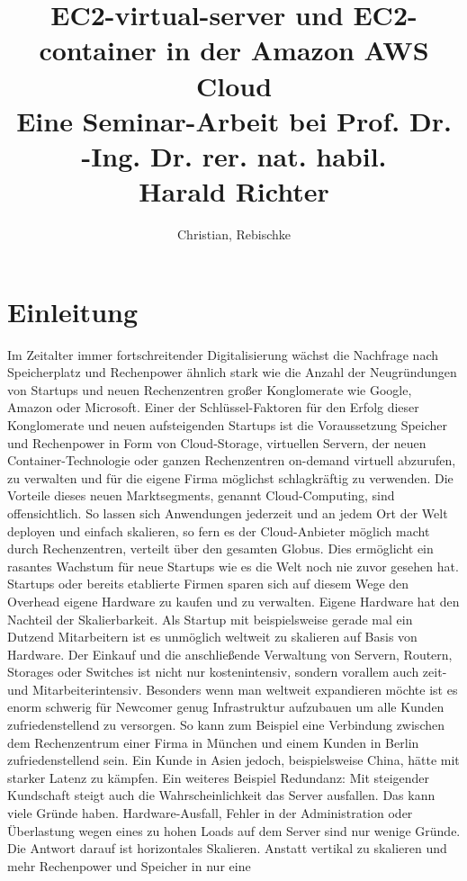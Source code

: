 \documentclass[titlepage]{report}
\title{EC2-virtual-server und EC2-container in der Amazon AWS Cloud \\
\large Eine Seminar-Arbeit bei Prof. Dr. -Ing. Dr. rer. nat. habil. \\
Harald Richter}
\author{Christian, Rebischke}
\begin{document}
\maketitle
\tableofcontents
\newpage
\chapter{Einleitung}
Im Zeitalter immer fortschreitender Digitalisierung wächst die Nachfrage
nach Speicherplatz und Rechenpower ähnlich stark wie die Anzahl der
Neugründungen von Startups und neuen Rechenzentren großer Konglomerate
wie Google, Amazon oder Microsoft. Einer der Schlüssel-Faktoren für den Erfolg
dieser Konglomerate und neuen aufsteigenden Startups ist die
Voraussetzung Speicher und Rechenpower in Form von Cloud-Storage,
virtuellen Servern, der neuen Container-Technologie oder ganzen Rechenzentren
on-demand virtuell abzurufen, zu verwalten und für die eigene Firma
möglichst schlagkräftig zu verwenden. Die Vorteile dieses neuen Marktsegments,
genannt Cloud-Computing, sind offensichtlich. So lassen sich Anwendungen
jederzeit und an jedem Ort der Welt deployen und einfach skalieren, so
fern es der Cloud-Anbieter möglich macht durch Rechenzentren, verteilt
über den gesamten Globus. Dies ermöglicht ein rasantes Wachstum für neue
Startups wie es die Welt noch nie zuvor gesehen hat. Startups oder
bereits etablierte Firmen sparen sich auf diesem Wege den Overhead
eigene Hardware zu kaufen und zu verwalten. Eigene Hardware hat den
Nachteil der Skalierbarkeit. Als Startup mit beispielsweise gerade mal ein Dutzend
Mitarbeitern ist es unmöglich weltweit zu skalieren auf Basis von
Hardware. Der Einkauf und die anschließende Verwaltung von Servern,
Routern, Storages oder Switches ist nicht nur kostenintensiv, sondern
vorallem auch zeit- und Mitarbeiterintensiv. Besonders wenn man weltweit
expandieren möchte ist es enorm schwerig für Newcomer genug
Infrastruktur aufzubauen um alle Kunden zufriedenstellend zu versorgen.
So kann zum Beispiel eine Verbindung zwischen dem Rechenzentrum einer
Firma in München und einem Kunden in Berlin zufriedenstellend sein. Ein
Kunde in Asien jedoch, beispielsweise China, hätte mit starker Latenz zu
kämpfen. Ein weiteres Beispiel Redundanz: Mit steigender Kundschaft
steigt auch die Wahrscheinlichkeit das Server ausfallen. Das kann viele
Gründe haben. Hardware-Ausfall, Fehler in der Administration oder
Überlastung wegen eines zu hohen Loads auf dem Server sind nur wenige
Gründe. Die Antwort darauf ist horizontales Skalieren. Anstatt vertikal
zu skalieren und mehr Rechenpower und Speicher in nur eine
\end{document}
